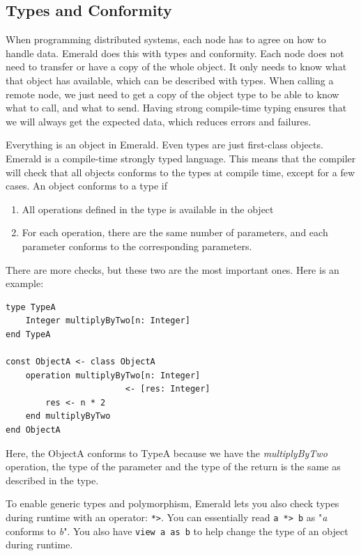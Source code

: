 \subsection{Types and Conformity}
When programming distributed systems, each node has to agree on how to handle data. Emerald does this with types and conformity. Each node does not need to transfer or have a copy of the whole object. It only needs to know what that object has available, which can be described with types. When calling a remote node, we just need to get a copy of the object type to be able to know what to call, and what to send. Having strong compile-time typing ensures that we will always get the expected data, which reduces errors and failures.

Everything is an object in Emerald. Even types are just first-class objects. 
Emerald is a compile-time strongly typed language. This means that the compiler will check that all objects conforms to the types at compile time, except for a few cases. An object conforms to a type if
\begin{enumerate}
    \item All operations defined in the type is available in the object
    \item For each operation, there are the same number of parameters, and each parameter conforms to the corresponding parameters.
\end{enumerate}
There are more checks, but these two are the most important ones.
Here is an example:
\begin{lstlisting}[language=emerald]
type TypeA
    Integer multiplyByTwo[n: Integer]
end TypeA

const ObjectA <- class ObjectA
    operation multiplyByTwo[n: Integer]
                        <- [res: Integer]
        res <- n * 2
    end multiplyByTwo
end ObjectA
\end{lstlisting}
Here, the ObjectA conforms to TypeA because we have the \textit{multiplyByTwo} operation, the type of the parameter and the type of the return is the same as described in the type.

To enable generic types and polymorphism, Emerald lets you also check types during runtime with an operator: \verb|*>|. You can essentially read \verb|a *> b| as "\textit{a} conforms to \textit{b}". You also have \verb|view a as b| to help change the type of an object during runtime.





